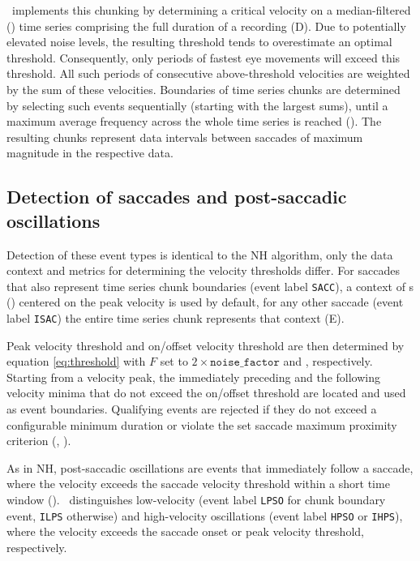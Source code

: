 \remodnav\ implements this chunking by determining a critical velocity on a
median-filtered () time series comprising the
full duration of a recording (D). Due to potentially elevated noise
levels, the resulting threshold tends to overestimate an optimal threshold.
Consequently, only periods of fastest eye movements will exceed this threshold.
All such periods of consecutive above-threshold velocities are weighted by the
sum of these velocities. Boundaries of time series chunks are determined by
selecting such events sequentially (starting with the largest sums), until a
maximum average frequency across the whole time series is reached
(). The resulting chunks represent data
intervals between saccades of maximum magnitude in the respective data.


\subsection*{Detection of saccades and post-saccadic oscillations}

Detection of these event types is identical to the NH algorithm, only the data
context and metrics for determining the velocity thresholds differ.  For
saccades that also represent time series chunk boundaries (event label
\texttt{SACC}), a context of \unit[1]{s}
() centered on the peak velocity is
used by default, for any other saccade (event label \texttt{ISAC}) the entire
time series chunk represents that context (E).

Peak velocity threshold and on/offset velocity threshold are then determined by
equation \ref{eq:threshold} with $F$ set to $2\times\mathtt{noise\_factor}$ and
, respectively. Starting from a velocity peak, the
immediately preceding and the following velocity minima that do not exceed the
on/offset threshold are located and used as event boundaries. Qualifying events
are rejected if they do not exceed a configurable minimum duration or violate
the set saccade maximum proximity criterion (,
).

As in NH, post-saccadic oscillations are events that immediately follow a
saccade, where the velocity exceeds the saccade velocity threshold within a short
time window (). \remodnav\ distinguishes low-velocity
(event label \texttt{LPSO} for chunk boundary event, \texttt{ILPS} otherwise)
and high-velocity oscillations (event label \texttt{HPSO} or \texttt{IHPS}),
where the velocity exceeds the saccade onset or peak velocity threshold,
respectively.

